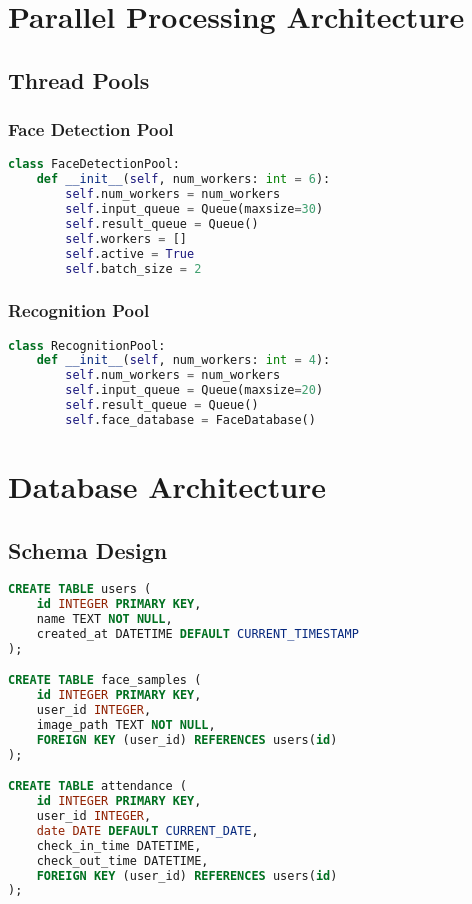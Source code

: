 \documentclass[11pt,a4paper]{report}
\begin{document}
\chapter{Parallel Processing Architecture}

\section{Thread Pools}

\subsection{Face Detection Pool}
\begin{lstlisting}[language=Python]
class FaceDetectionPool:
    def __init__(self, num_workers: int = 6):
        self.num_workers = num_workers
        self.input_queue = Queue(maxsize=30)
        self.result_queue = Queue()
        self.workers = []
        self.active = True
        self.batch_size = 2
\end{lstlisting}

\subsection{Recognition Pool}
\begin{lstlisting}[language=Python]
class RecognitionPool:
    def __init__(self, num_workers: int = 4):
        self.num_workers = num_workers
        self.input_queue = Queue(maxsize=20)
        self.result_queue = Queue()
        self.face_database = FaceDatabase()
\end{lstlisting}

\chapter{Database Architecture}

\section{Schema Design}
\begin{lstlisting}[language=SQL]
CREATE TABLE users (
    id INTEGER PRIMARY KEY,
    name TEXT NOT NULL,
    created_at DATETIME DEFAULT CURRENT_TIMESTAMP
);

CREATE TABLE face_samples (
    id INTEGER PRIMARY KEY,
    user_id INTEGER,
    image_path TEXT NOT NULL,
    FOREIGN KEY (user_id) REFERENCES users(id)
);

CREATE TABLE attendance (
    id INTEGER PRIMARY KEY,
    user_id INTEGER,
    date DATE DEFAULT CURRENT_DATE,
    check_in_time DATETIME,
    check_out_time DATETIME,
    FOREIGN KEY (user_id) REFERENCES users(id)
);
\end{lstlisting}
\end{document}

